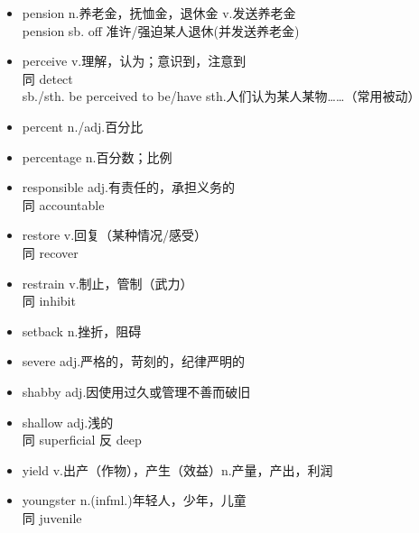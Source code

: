 \documentclass[11pt,a4paper,UTF8,titlepage]{ctexrep} %
\begin{document}
\begin{multicols}{2}
\begin{itemize}
        \item pension n.养老金，抚恤金，退休金 v.发送养老金\\pension sb. off 准许/强迫某人退休(并发送养老金)
        \item perceive v.理解，认为；意识到，注意到\\同 detect\\sb./sth. be perceived to be/have sth.人们认为某人某物……（常用被动）
        \item percent n./adj.百分比
        \item percentage n.百分数；比例
        \item responsible adj.有责任的，承担义务的\\同 accountable
        \item restore v.回复（某种情况/感受）\\同 recover
        \item restrain v.制止，管制（武力）\\同 inhibit
        \item setback n.挫折，阻碍
        \item severe adj.严格的，苛刻的，纪律严明的
        \item shabby adj.因使用过久或管理不善而破旧
        \item shallow adj.浅的\\同 superficial 反 deep
        \item yield v.出产（作物），产生（效益）n.产量，产出，利润
        \item youngster n.(infml.)年轻人，少年，儿童\\同 juvenile
    \end{itemize}
    \end{multicols}
\end{document}
